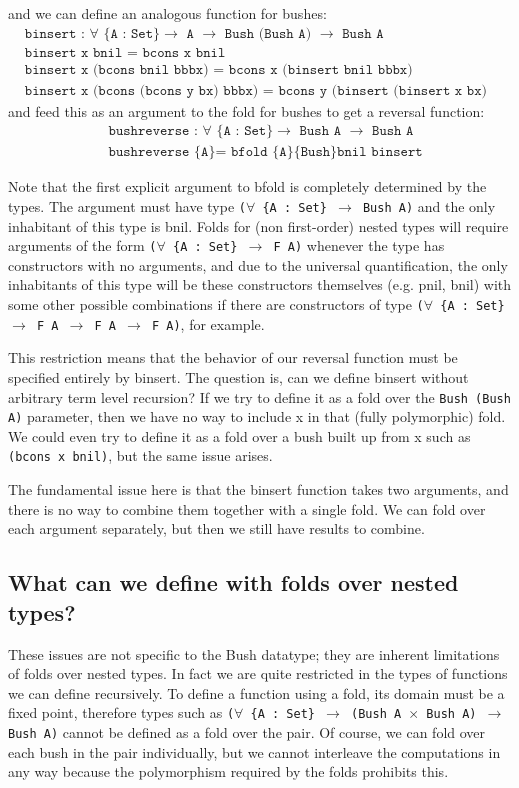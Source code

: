 \documentclass[acmsmall,review,anonymous]{acmart}
\theoremstyle{definition}
\begin{document}
and we can define an analogous function for bushes:
\begin{align*}
  &\texttt{binsert : $\forall$ \{A : Set\} $\to$ A $\to$ Bush (Bush A) $\to$ Bush A} \\
  &\texttt{binsert x bnil = bcons x bnil } \\
  &\texttt{binsert x (bcons bnil bbbx) = bcons x (binsert bnil bbbx)} \\
  &\texttt{binsert x (bcons (bcons y bx) bbbx) = bcons y (binsert (binsert x bx) bbbx)}
\end{align*}
and feed this as an argument to the fold for bushes to get a reversal function: 
\begin{align*}
  &\texttt{bushreverse : $\forall$ \{A : Set\} $\to$ Bush A $\to$ Bush A} \\
  &\texttt{bushreverse \{A\} = bfold \{A\} \{Bush\} bnil binsert}
\end{align*}

Note that the first explicit argument to bfold is completely determined by the types. 
The argument must have type \texttt{($\forall$ \{A : Set\} $\to$ Bush A)} and the only inhabitant of this type is bnil.
Folds for (non first-order) nested types will require arguments of the form \texttt{($\forall$ \{A : Set\} $\to$ F A)} whenever 
the type has constructors with no arguments, and due to the universal quantification, the only inhabitants of this type 
will be these constructors themselves (e.g. pnil, bnil) with some other possible combinations 
if there are constructors of type \texttt{($\forall$ \{A : Set\} $\to$ F A $\to$ F A $\to$ F A)}, for example.

This restriction means that the behavior of our reversal function must be specified entirely by binsert. 
The question is, can we define binsert without arbitrary term level recursion? 
If we try to define it as a fold over the \texttt{Bush (Bush A)} parameter, then we have no 
way to include x in that (fully polymorphic) fold. We could even try to define it as a fold over a 
bush built up from x such as \texttt{(bcons x bnil)}, but the same issue arises. 

The fundamental issue here is that the binsert function takes two arguments, 
and there is no way to combine them together with a single fold. We can fold
over each argument separately, but then we still have results to combine. 

\subsection{What can we define with folds over nested types?}
These issues are not specific to the Bush datatype; they are inherent limitations of folds
over nested types. In fact we are quite restricted in the types of functions we can define recursively. 
To define a function using a fold, its domain must be a fixed point, therefore
types such as \texttt{($\forall$ \{A : Set\} $\to$ (Bush A $\times$ Bush A) $\to$ Bush A)} cannot be defined as
a fold over the pair. Of course, we can fold over each bush in the pair individually, but we cannot interleave
the computations in any way because the polymorphism required by the folds prohibits this.
\end{document}
